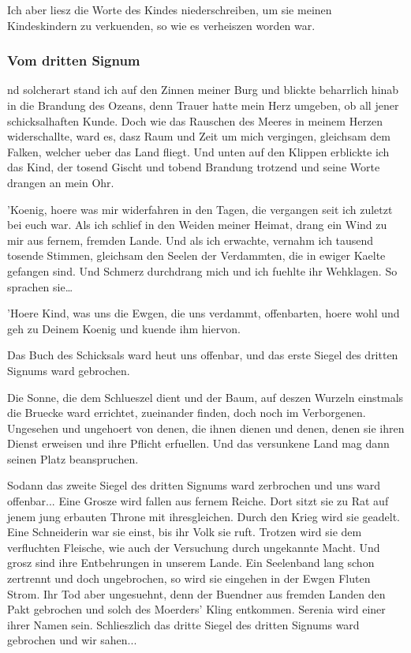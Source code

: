 \documentclass[a5paper,8pt]{book}
\begin{document}
Ich aber liesz die Worte des Kindes niederschreiben, um sie meinen Kindeskindern zu verkuenden, so wie es verheiszen worden war.

\newpage

\subsubsection{ Vom dritten Signum}

nd solcherart stand ich auf den Zinnen meiner Burg und blickte beharrlich hinab in die Brandung des Ozeans, denn Trauer hatte mein Herz umgeben, ob all jener schicksalhaften Kunde. Doch wie das Rauschen des Meeres in meinem Herzen widerschallte, ward es, dasz Raum und Zeit um mich vergingen, gleichsam dem Falken, welcher ueber das Land fliegt. Und unten auf den Klippen erblickte ich das Kind, der tosend Gischt und tobend Brandung trotzend und seine Worte drangen an mein Ohr.

’Koenig, hoere was mir widerfahren in den Tagen, die vergangen seit ich zuletzt bei euch war. Als ich schlief in den Weiden meiner Heimat, drang ein Wind zu mir aus fernem, fremden Lande. Und als ich erwachte, vernahm ich tausend tosende Stimmen, gleichsam den Seelen der Verdammten, die in ewiger Kaelte gefangen sind. Und Schmerz durchdrang mich und ich fuehlte ihr Wehklagen. So sprachen sie… 

’Hoere Kind, was uns die Ewgen, die uns verdammt, offenbarten, hoere wohl und geh zu Deinem Koenig und kuende ihm hiervon. 

Das Buch des Schicksals ward heut uns offenbar, und das erste Siegel des dritten Signums ward gebrochen.

Die Sonne, die dem Schlueszel dient und der Baum, auf deszen Wurzeln einstmals die Bruecke ward errichtet, zueinander finden, doch noch im Verborgenen. Ungesehen und ungehoert von denen, die ihnen dienen und denen, denen sie ihren Dienst erweisen und ihre Pflicht erfuellen. Und das versunkene Land mag dann seinen Platz beanspruchen. 

Sodann das zweite Siegel des dritten Signums ward zerbrochen und uns ward offenbar...
Eine Grosze wird fallen aus fernem Reiche. Dort sitzt sie zu Rat auf jenem jung erbauten Throne mit ihresgleichen. Durch den Krieg wird sie geadelt. Eine Schneiderin war sie einst, bis ihr Volk sie ruft. Trotzen wird sie dem verfluchten Fleische, wie auch der Versuchung durch ungekannte Macht. Und grosz sind ihre Entbehrungen in unserem Lande. Ein Seelenband lang schon zertrennt und doch ungebrochen, so wird sie eingehen in der Ewgen Fluten Strom. Ihr Tod aber ungesuehnt, denn der Buendner aus fremden Landen den Pakt gebrochen und solch des Moerders’ Kling entkommen. Serenia wird einer ihrer Namen sein. 
Schlieszlich das dritte Siegel des dritten Signums ward gebrochen und wir sahen...
\end{document}

